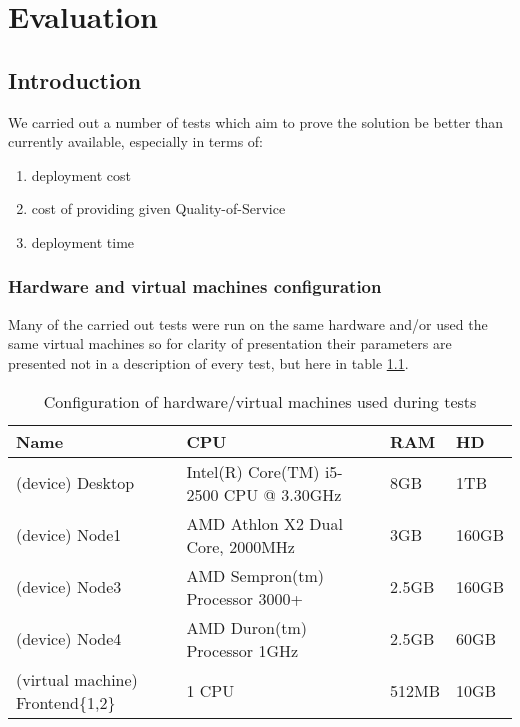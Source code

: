 \chapter{Evaluation}


\section{Introduction}
We carried out a number of tests which aim to prove the solution be better than currently available, especially in terms of:
\begin{enumerate}
  \item deployment cost
  \item cost of providing given Quality-of-Service
  \item deployment time
\end{enumerate}

\subsection*{Hardware and virtual machines configuration}
Many of the carried out tests were run on the same hardware and/or used the same virtual machines so for clarity of presentation their parameters are presented not in a description of every test, but here in table \ref{tbl:test-deployment-time-common-hardware-configuration}.

\begin{table}
  \centering
  \begin{tabular}{ | l | l | l | l | }
    \hline                        
    Name & CPU & RAM & HD \\
    \hline
    (device) Desktop        & Intel(R) Core(TM) i5-2500 CPU @ 3.30GHz & 8GB & 1TB \\
    (device) Node1        & AMD Athlon\texttrademark 64 X2 Dual Core, 2000MHz & 3GB & 160GB \\
    (device) Node3        & AMD Sempron(tm) Processor 3000+ & 2.5GB & 160GB \\
    (device) Node4        & AMD Duron(tm) Processor 1GHz& 2.5GB & 60GB \\
    (virtual machine) Frontend\{1,2\}  & 1 CPU & 512MB & 10GB \\
    \hline  
  \end{tabular}
  \caption{Configuration of hardware/virtual machines used during tests}
  \label{tbl:test-deployment-time-common-hardware-configuration}
\end{table}

